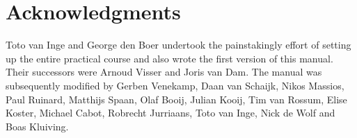 \documentclass[10pt]{scrartcl}
\begin{document}
%
%
%


\section*{Acknowledgments}

Toto van Inge and George den Boer undertook the painstakingly effort of
setting up the entire practical course and also wrote the first version
of this manual.  Their successors were Arnoud Visser and Joris van Dam.
The manual was 
subsequently modified by Gerben Venekamp, Daan van
Schaijk, Nikos Massios, Paul Ruinard, Matthijs Spaan,
Olaf Booij, Julian Kooij, Tim van Rossum, Elise Koster, Michael Cabot, 
Robrecht Jurriaans, Toto van Inge, Nick de Wolf and Boas Kluiving.
\end{document}
